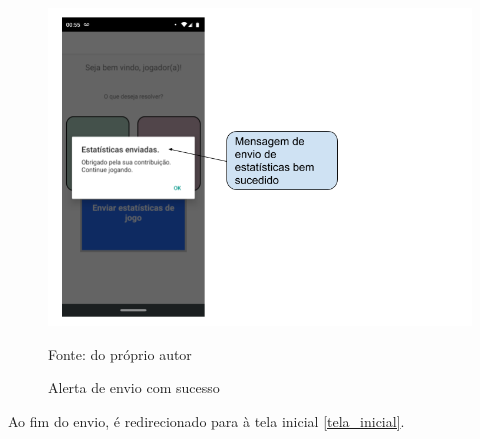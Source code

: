 \begin{figure}[H]
\centering
\caption{Alerta de envio com sucesso}
\includegraphics[scale=0.5]{figuras/estatisticas/estatisticas_enviadas.png}

\label{estatisticas_sucesso_envio}
\small{Fonte: do próprio autor}
\end{figure}

Ao fim do envio, é redirecionado para à tela inicial \ref{tela_inicial}.